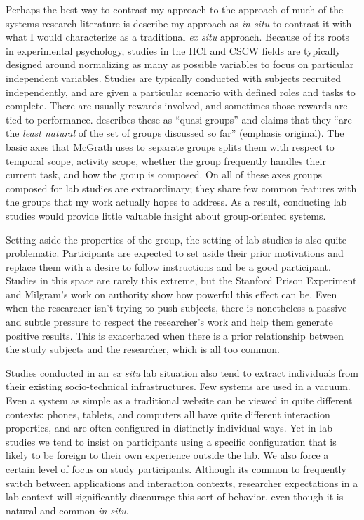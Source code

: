 Perhaps the best way to contrast my approach to the approach of much of the systems research literature is describe my approach as \emph{in situ} to contrast it with what I would characterize as a traditional \emph{ex situ} approach. Because of its roots in experimental psychology, studies in the HCI and CSCW fields are typically designed around normalizing as many as possible variables to focus on particular independent variables. Studies are typically conducted with subjects recruited independently, and are given a particular scenario with defined roles and tasks to complete. There are usually rewards involved, and sometimes those rewards are tied to performance. \citet{McGrath:1984un} describes these as ``quasi-groups'' and claims that they ``are the \emph{least natural} of the set of groups discussed so far'' (emphasis original). The basic axes that McGrath uses to separate groups splits them with respect to temporal scope, activity scope, whether the group frequently handles their current task, and how the group is composed. On all of these axes groups composed for lab studies are extraordinary; they share few common features with the groups that my work actually hopes to address. As a result, conducting lab studies would provide little valuable insight about group-oriented systems.


Setting aside the properties of the group, the setting of lab studies is also quite problematic. Participants are expected to set aside their prior motivations and replace them with a desire to follow instructions and be a good participant. Studies in this space are rarely this extreme, but the Stanford Prison Experiment \citep{Haney:1973wf} and Milgram's work on authority \citep{Milgram:1983vh} show how powerful this effect can be. Even when the researcher isn't trying to push subjects, there is nonetheless a passive and subtle pressure to respect the researcher's work and help them generate positive results. This is exacerbated when there is a prior relationship between the study subjects and the researcher, which is all too common. 

Studies conducted in an \emph{ex situ} lab situation also tend to extract individuals from their existing socio-technical infrastructures. Few systems are used in a vacuum. Even a system as simple as a traditional website can be viewed in quite different contexts: phones, tablets, and computers all have quite different interaction properties, and are often configured in distinctly individual ways. Yet in lab studies we tend to insist on participants using a specific configuration that is likely to be foreign to their own experience outside the lab. We also force a certain level of focus on study participants. Although its common to frequently switch between applications and interaction contexts, researcher expectations in a lab context will significantly discourage this sort of behavior, even though it is natural and common \emph{in situ}. 

